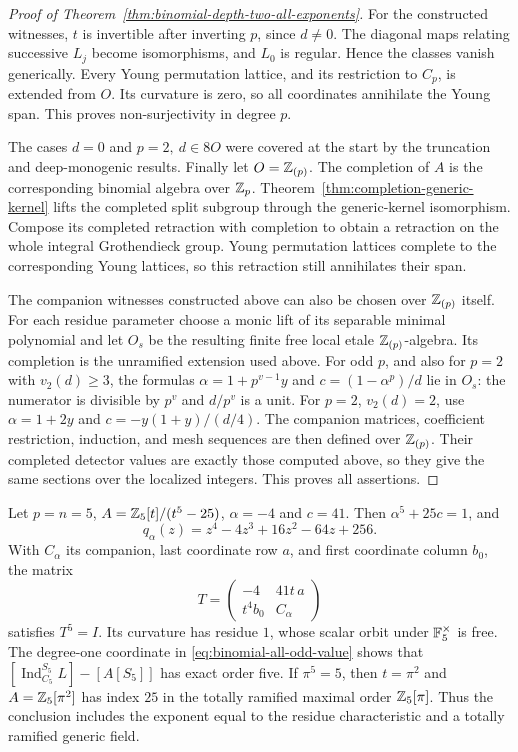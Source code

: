 \begin{proof}[Proof of Theorem~\ref{thm:binomial-depth-two-all-exponents}]
For the constructed witnesses, $t$ is invertible after
inverting $p$, since $d\ne0$.  The diagonal maps relating
successive $L_j$ become isomorphisms, and $L_0$ is regular.
Hence the classes vanish generically.
Every Young permutation lattice, and its restriction to
$C_p$, is extended from $O$.  Its curvature is zero, so
all coordinates annihilate the Young span.
This proves non-surjectivity in degree $p$.

The cases $d=0$ and $p=2,\ d\in8O$ were covered at the
start by the truncation and deep-monogenic results.
Finally let $O=\mathbb Z_{(p)}$.  The completion of $A$ is the
corresponding binomial algebra over $\mathbb Z_p$.
Theorem~\ref{thm:completion-generic-kernel} lifts the
completed split subgroup through the generic-kernel
isomorphism.  Compose its completed retraction with
completion to obtain a retraction on the whole integral
Grothendieck group.  Young permutation lattices complete
to the corresponding Young lattices, so this retraction
still annihilates their span.

The companion witnesses constructed above can also be chosen
over $\mathbb Z_{(p)}$ itself.  For each residue parameter choose a
monic lift of its separable minimal polynomial and let $O_s$
be the resulting finite free local etale $\mathbb Z_{(p)}$-algebra.
Its completion is the unramified extension used above.
For odd $p$, and also for $p=2$ with $v_2(d)\ge3$, the formulas
$\alpha=1+p^{v-1}y$ and $c=(1-\alpha^p)/d$ lie in $O_s$:
the numerator is divisible by $p^v$ and $d/p^v$ is a unit.
For $p=2$, $v_2(d)=2$, use
$\alpha=1+2y$ and $c=-y(1+y)/(d/4)$.
The companion matrices, coefficient restriction, induction,
and mesh sequences are then defined over $\mathbb Z_{(p)}$.
Their completed detector values are exactly those computed
above, so they give the same sections over the localized integers.
This proves all assertions.
\end{proof}

\begin{example}\label{ex:quintic-depth-two-twentyfive}
Let $p=n=5$, $A=\mathbb Z_5[t]/(t^5-25)$, $\alpha=-4$ and $c=41$.
Then $\alpha^5+25c=1$, and
\[
 q_\alpha(z)=z^4-4z^3+16z^2-64z+256.
\]
With $C_\alpha$ its companion, last coordinate row $a$,
and first coordinate column $b_0$, the matrix
\[
 T=\begin{pmatrix}-4&41t\,a\\t^4b_0&C_\alpha\end{pmatrix}
\]
satisfies $T^5=I$.
Its curvature has residue $1$, whose scalar orbit under
$\mathbb F_5^\times$ is free.  The degree-one coordinate in
\eqref{eq:binomial-all-odd-value} shows that
$[\operatorname{Ind}_{C_5}^{S_5}L]-[A[S_5]]$ has exact
order five.
If $\pi^5=5$, then $t=\pi^2$ and
$A=\mathbb Z_5[\pi^2]$ has index $25$ in the totally ramified
maximal order $\mathbb Z_5[\pi]$.
Thus the conclusion includes the exponent equal to
the residue characteristic and a totally ramified generic field.
\end{example}
